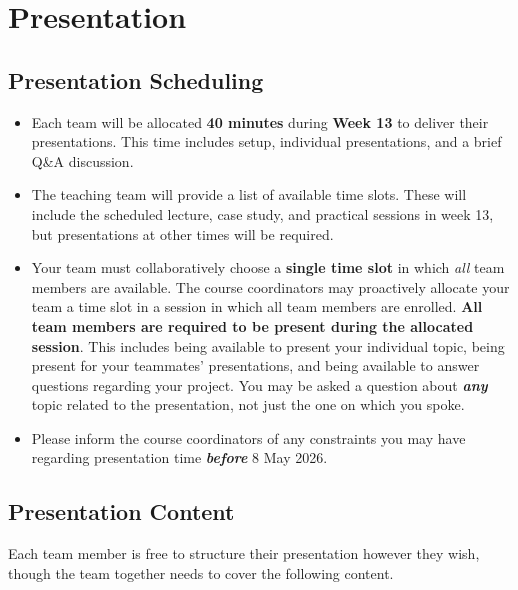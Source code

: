 \documentclass{csse4400}
\begin{document}
\section{Presentation}

\subsection{Presentation Scheduling}

\begin{itemize}[topsep=5pt,partopsep=1pt,itemsep=3pt,parsep=3pt]
  \item Each team will be allocated \textbf{40 minutes} during \textbf{Week 13} to deliver their presentations.
        This time includes setup, individual presentations, and a brief Q\&A discussion.
  \item The teaching team will provide a list of available time slots.
        These will include the scheduled lecture, case study, and practical sessions in week 13,
        but presentations at other times will be required.
  \item Your team must collaboratively choose a \textbf{single time slot} in which \textit{all} team members are available.
        The course coordinators may proactively allocate your team a time slot in a session in which all team members are enrolled.        
        \textbf{All team members are required to be present during the allocated session}.
        This includes being available to present your individual topic,
        being present for your teammates' presentations,
        and being available to answer questions regarding your project.
        You may be asked a question about \textbf{\textit{any}} topic related to the presentation,
        not just the one on which you spoke.
  \item Please inform the course coordinators of any constraints you may have regarding presentation time
        \textbf{\textit{before}} 8 May 2026.
\end{itemize}

\subsection{Presentation Content}

Each team member is free to structure their presentation however they wish,
though the team together needs to cover the following content.
\end{document}
